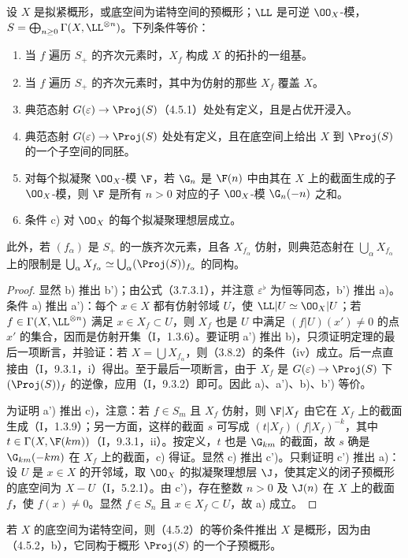 设 $X$ 是拟紧概形，或底空间为诺特空间的预概形；$\LL$ 是可逆 $\OO_X$-模，$S=\bigoplus_{n\geq0}\Gamma(X,\LL^{\otimes n})$。下列条件等价：
\begin{enumerate}[label=\alph*)]
\item 当 $f$ 遍历 $S_+$ 的齐次元素时，$X_f$ 构成 $X$ 的拓扑的一组基。
\item[\textup{a')}] 当 $f$ 遍历 $S_+$ 的齐次元素时，其中为仿射的那些 $X_f$ 覆盖 $X$。
\item[\textup{b)}] 典范态射 $G(\varepsilon)\to\Proj(S)$（4.5.1）处处有定义，且是占优开浸入。
\item[\textup{b')}] 典范态射 $G(\varepsilon)\to\Proj(S)$ 处处有定义，且在底空间上给出 $X$ 到 $\Proj(S)$ 的一个子空间的同胚。
\item[\textup{c)}] 对每个拟凝聚 $\OO_X$-模 $\F$，若 $\G_n$ 是 $\F(n)$ 中由其在 $X$ 上的截面生成的子 $\OO_X$-模，则 $\F$ 是所有 $n>0$ 对应的子 $\OO_X$-模 $\G_n(-n)$ 之和。
\item[\textup{c')}] 条件 \textup{c)} 对 $\OO_X$ 的每个拟凝聚理想层成立。
\end{enumerate}
此外，若 $(f_\alpha)$ 是 $S_+$ 的一族齐次元素，且各 $X_{f_\alpha}$ 仿射，则典范态射在 $\bigcup_\alpha X_{f_\alpha}$ 上的限制是
$\bigcup_\alpha X_{f_\alpha}\simeq\bigcup_\alpha(\Proj(S))_{f_\alpha}$ 的同构。
\begin{proof}
显然 b) 推出 b')；由公式（3.7.3.1），并注意 $\varepsilon^\flat$ 为恒等同态，b') 推出 a)。条件 a) 推出 a')：每个 $x\in X$ 都有仿射邻域 $U$，使 $\LL|U\simeq\OO_X|U$；若 $f\in\Gamma(X,\LL^{\otimes n})$ 满足 $x\in X_f\subset U$，则 $X_f$ 也是 $U$ 中满足 $(f|U)(x')\ne0$ 的点 $x'$ 的集合，因而是仿射开集（I，1.3.6）。要证明 a') 推出 b)，只须证明定理的最后一项断言，并验证：若 $X=\bigcup X_{f_\alpha}$，则（3.8.2）的条件（iv）成立。后一点直接由（I，9.3.1，i）得出。至于最后一项断言，由于 $X_f$ 是 $G(\varepsilon)\to\Proj(S)$ 下 $(\Proj(S))_f$ 的逆像，应用（I，9.3.2）即可。因此 a)、a')、b)、b') 等价。

为证明 a') 推出 c)，注意：若 $f\in S_m$ 且 $X_f$ 仿射，则 $\F|X_f$ 由它在 $X_f$ 上的截面生成（I，1.3.9）；另一方面，这样的截面 $s$ 可写成
$(t|X_f)(f|X_f)^{-k}$，其中 $t\in\Gamma(X,\F(km))$（I，9.3.1，ii）。按定义，$t$ 也是 $\G_{km}$ 的截面，故 $s$ 确是 $\G_{km}(-km)$ 在 $X_f$ 上的截面，c) 得证。显然 c) 推出 c')。只剩证明 c') 推出 a)：设 $U$ 是 $x\in X$ 的开邻域，取 $\OO_X$ 的拟凝聚理想层 $\J$，使其定义的闭子预概形的底空间为 $X-U$（I，5.2.1）。由 c')，存在整数 $n>0$ 及 $\J(n)$ 在 $X$ 上的截面 $f$，使 $f(x)\ne0$。显然 $f\in S_n$ 且 $x\in X_f\subset U$，故 a) 成立。
\end{proof}
若 $X$ 的底空间为诺特空间，则（4.5.2）的等价条件推出 $X$ 是概形，因为由（4.5.2，b），它同构于概形 $\Proj(S)$ 的一个子预概形。

